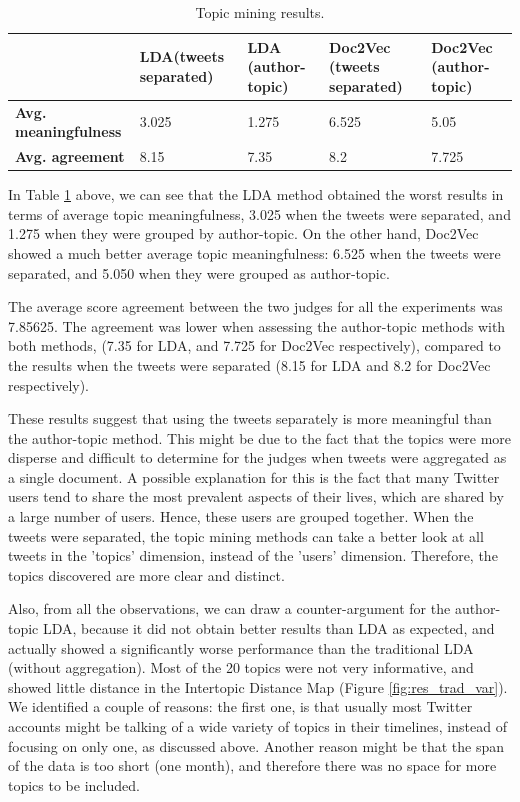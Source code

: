 \documentclass[11pt]{article}
\begin{document}
\begin{table}[H]
	\centering
	\begin{tabular}{| l | p{2.5cm} | p{2.5cm} | p{2.5cm} | p{2.5cm} |}
		\hline
		& \textbf{LDA\newline (tweets separated)} & \textbf{LDA (author-topic)} & \textbf{Doc2Vec (tweets separated)} & \textbf{Doc2Vec (author-topic)}\\
		\hline
		\textbf{Avg. meaningfulness} & 3.025 & 1.275 & \cellcolor{blue!25}6.525 & 5.05\\
		\textbf{Avg. agreement} & 8.15 & 7.35 & \cellcolor{blue!25}8.2 & 7.725\\
		\hline
	\end{tabular}
	\caption{Topic mining results.}
	\label{tb:res_meaningfulness}
\end{table}

In Table \ref{tb:res_meaningfulness} above, we can see that the LDA method obtained the worst results in terms of average topic meaningfulness, 3.025 when the tweets were separated, and 1.275 when they were grouped by author-topic. On the other hand, Doc2Vec showed a much better average topic meaningfulness: 6.525 when the tweets were separated, and 5.050 when they were grouped as author-topic. 

The average score agreement between the two judges for all the experiments was 7.85625. The agreement was lower when assessing the author-topic methods with both methods, (7.35 for LDA, and 7.725 for Doc2Vec respectively), compared to the results when the tweets were separated (8.15 for LDA and 8.2 for Doc2Vec respectively). 

These results suggest that using the tweets separately is more meaningful than the author-topic method. This might be due to the fact that the topics were more disperse and difficult to determine for the judges when tweets were aggregated as a single document. A possible explanation for this is the fact that many Twitter users tend to share the most prevalent aspects of their lives, which are shared by a large number of users. Hence, these users are grouped together. When the tweets were separated, the topic mining methods can take a better look at all tweets in the 'topics' dimension, instead of the 'users' dimension. Therefore, the topics discovered are more clear and distinct.

Also, from all the observations, we can draw a counter-argument for the author-topic LDA, because it did not obtain better results than LDA as expected, and actually showed a significantly worse performance than the traditional LDA (without aggregation). Most of the 20 topics were not very informative, and showed little distance in the Intertopic Distance Map (Figure \ref{fig:res_trad_var}). We identified a couple of reasons: the first one, is that usually most Twitter accounts might be talking of a wide variety of topics in their timelines, instead of focusing on only one, as discussed above. Another reason might be that the span of the data is too short (one month), and therefore there was no space for more topics to be included.
\end{document}
